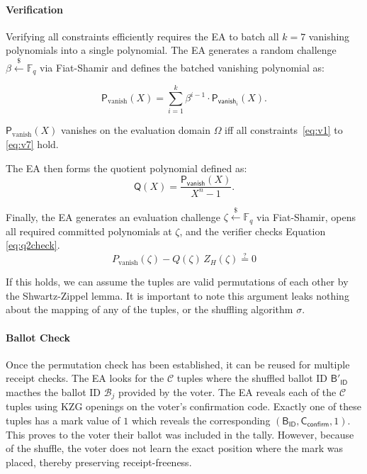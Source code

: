 \paragraph{Verification}\mbox{}\newline
Verifying all constraints efficiently requires the EA to batch all $k=7$ vanishing polynomials into a single polynomial. 
The EA generates a random challenge $\beta \stackrel{\$}{\leftarrow} \mathbb{F}_q$ via Fiat-Shamir and defines the batched vanishing polynomial as:

\begin{equation}
  \mathsf{P}_{\text{vanish}}(X)
  = \sum_{i=1}^{k} \beta^{i-1} \cdot \mathsf{P}_{\mathsf{vanish}_i}(X).
  \label{eq:batch2}
\end{equation}

$\mathsf{P}_{\text{vanish}}(X)$ vanishes on the evaluation domain $\Omega$ iff all
constraints~\eqref{eq:v1} to \eqref{eq:v7} hold.

The EA then forms the quotient polynomial defined as:
\begin{equation}
  \label{eq:q2}
  \mathsf{Q}(X) = \frac{\mathsf{P}_{\mathsf{vanish}}(X)}{X^n -1}.
\end{equation}

Finally, the EA generates an evaluation challenge $\zeta \stackrel{\$}{\leftarrow} \mathbb{F}_q$ via
Fiat-Shamir, opens all required committed polynomials at $\zeta$, and the verifier
checks Equation \ref{eq:q2check}.
\begin{equation}
  \label{eq:q2check}
  P_{\text{vanish}}(\zeta) - Q(\zeta)\, Z_H(\zeta) \stackrel{?}{=} 0
\end{equation}

If this holds, we can assume the tuples are valid permutations of each other by the Shwartz-Zippel lemma. 
It is important to note this argument leaks nothing about the mapping of any of the tuples, or the shuffling algorithm $\sigma$. 

\paragraph{Ballot Check}\mbox{}\newline
Once the permutation check has been established, it can be reused for multiple receipt checks.
The EA looks for the $\mathcal{C}$ tuples where the shuffled ballot ID $\mathsf{B}'_\mathsf{ID}$ macthes the ballot ID $\mathcal{B}_j$ provided by the voter. 
The EA reveals each of the $\mathcal{C}$ tuples using KZG openings on the voter's confirmation code.
Exactly one of these tuples has a mark value of $1$ which reveals the corresponding $(\mathsf{B}_\mathsf{ID}, \mathsf{C}_{\mathsf{confirm}}, 1)$. 
This proves to the voter their ballot was included in the tally. 
However, because of the shuffle, the voter does not learn the exact position where the mark was placed, thereby preserving receipt-freeness.




